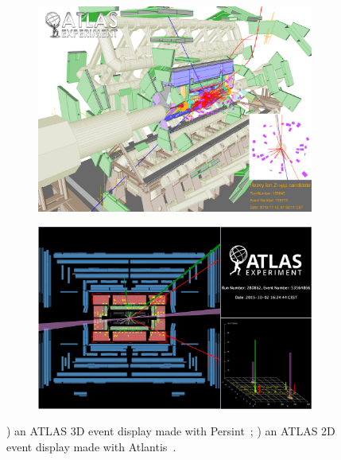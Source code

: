 \documentclass[12pt,a4paper]{article}
\begin{document}


\begin{figure}
	\centering
	\begin{subfigure}[b]{0.475\textwidth}
		\centering
		\includegraphics[width=\textwidth]{Persint-ATLAS-Zmumu-3d-hi-728772}
		\caption[ATLAS 3D event display made with Persint]{{\small}}
		\label{fig:atlas-persint}
	\end{subfigure}
	\quad
	\begin{subfigure}[b]{0.475\textwidth}
		\centering
		\includegraphics[width=\textwidth]{atlas-atlantis-run280862-evt53564866}
		\caption[ATLAS 2D event display made with Atlantis]%
		{{\small }}
		\label{fig:atlas-atlantis}
	\end{subfigure}
	\caption[Using 3D editing software for HEP Geometry]
	{\small {}) an ATLAS 3D event display made with Persint~\cite{AtlasPersintZmumuED,ATLASPersint2012}; ) an ATLAS 2D event display made with Atlantis~\cite{AtlasAtlantisHiggsED,ATLASAtlantis}.}
	\label{fig:cms-sketchup}
\end{figure}
\end{document}
